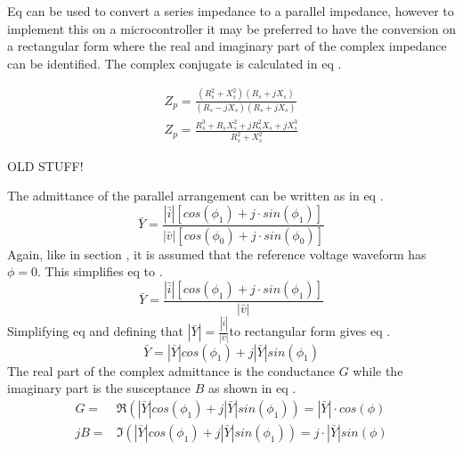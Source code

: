Eq  can be used to convert a series impedance to a parallel impedance, however to implement this on a microcontroller it may be preferred to have the conversion on a rectangular form where the real and imaginary part of the complex impedance can be identified. The complex conjugate is calculated in eq .

\begin{equation}\label{eq:4_1_5_ParallelModelx5}
    \begin{split}
        Z_p = \frac{(R_s^2 + X_s^2)(R_s + jX_s)}{(R_s - jX_s)(R_s + jX_s)} \\
        Z_p = \frac{R_s^3+R_sX_s^2+jR_s^2X_s+jX_s^3}{R_s^2+X_s^2}
    \end{split}
\end{equation}

OLD STUFF!

The admittance of the parallel arrangement can be written as in eq .
\begin{equation}\label{eq:4_1_5_ParallelModel1}
    \bar Y = \frac{|\bar i| [cos(\phi_1) + j\cdot sin(\phi_1)]}{|\bar v| [cos(\phi_0) +j\cdot sin(\phi_0)]}
\end{equation}
Again, like in section , it is assumed that the reference voltage waveform has $\phi = 0$. This simplifies eq  to .
\begin{equation}\label{eq:4_1_5_ParallelModel2}
    \bar Y = \frac{|\bar i| [cos(\phi_1) + j\cdot sin(\phi_1)]}{|\bar v|}
\end{equation}
Simplifying eq  and defining that $|\bar Y| = \frac{|\bar i|}{|\bar v|}$to rectangular form gives eq .
\begin{equation}\label{eq:4_1_5_ParallelModel3}
    \bar Y = |\bar Y| cos(\phi_1) + j |\bar Y| sin(\phi_1)
\end{equation}
The real part of the complex admittance is the conductance $G$ while the imaginary part is the susceptance $B$ as shown in eq .
\begin{equation}\label{eq:4_1_5_ParallelModel4}
    \begin{split}
        G =& \Re(|\bar Y| cos(\phi_1) + j |\bar Y| sin(\phi_1)) = |\bar Y| \cdot cos(\phi)\\
        jB =& \Im(|\bar Y| cos(\phi_1) + j |\bar Y| sin(\phi_1)) =  j\cdot |\bar Y| sin(\phi)  
    \end{split}
\end{equation}

